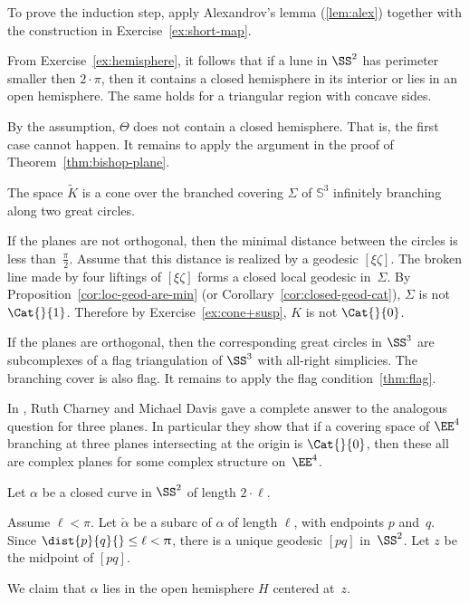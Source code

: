 To prove the induction step, apply Alexandrov's lemma (\ref{lem:alex}) 
together with the construction in Exercise~\ref{ex:short-map}.
\qeds

From  Exercise~\ref{ex:hemisphere}, it follows that if a lune in $\SS^2$ has perimeter smaller then $2\cdot\pi$, then it contains a closed hemisphere in its interior or lies in an open hemisphere.
The same holds for a triangular region with concave sides.  

By the assumption, $\Theta$ does not contain a closed hemisphere. 
That is, the first case cannot happen.
It remains to apply the argument in the proof of Theorem~\ref{thm:bishop-plane}. 
\qeds


The space $\tilde K$ is a cone over the branched covering $\Sigma$ of $\mathbb{S}^3$ infinitely branching along two great circles.

If the planes are not orthogonal, then the minimal distance between the circles is less than~$\tfrac\pi2$.
Assume that this distance is realized by a geodesic $[\xi\zeta]$.
The broken line made by four liftings of $[\xi\zeta]$ forms a closed 
local
geodesic in~$\Sigma$. 
By Proposition~\ref{cor:loc-geod-are-min}
(or Corollary~\ref{cor:closed-geod-cat}),  
$\Sigma$ is not $\Cat{}{1}$.
Therefore by Exercise~\ref{ex:cone+susp}, $K$ is not $\Cat{}{0}$.

If the planes are orthogonal, then the corresponding great circles in $\SS^3$ are subcomplexes of a flag triangulation of $\SS^3$ with all-right simplicies.
The branching cover is also flag.
It remains to apply the flag condition~\ref{thm:flag}.\qeds

In \cite{charney-davis-93}, Ruth Charney and Michael Davis
gave a complete answer to the analogous question for three planes.
In particular they show that if a covering space of $\EE^4$
branching at three planes intersecting at the origin is $\Cat{}{0}$, then these all are complex planes for some complex structure on~$\EE^4$.


Let $\alpha$ be a closed curve in $\SS^2$ of length $2\cdot\ell$.

Assume $\ell<\pi$.
Let $\check\alpha$ be a subarc of $\alpha$ of length $\ell$, with endpoints $p$ and~$q$. 
Since $\dist{p}{q}{}\le\ell<\pi$, there is a unique geodesic $[pq]$ in~$\SS^2$.  
Let $z$ be the midpoint of $[pq]$. 

We claim that $\alpha$ lies in the open hemisphere $H$ centered at~$z$.  

